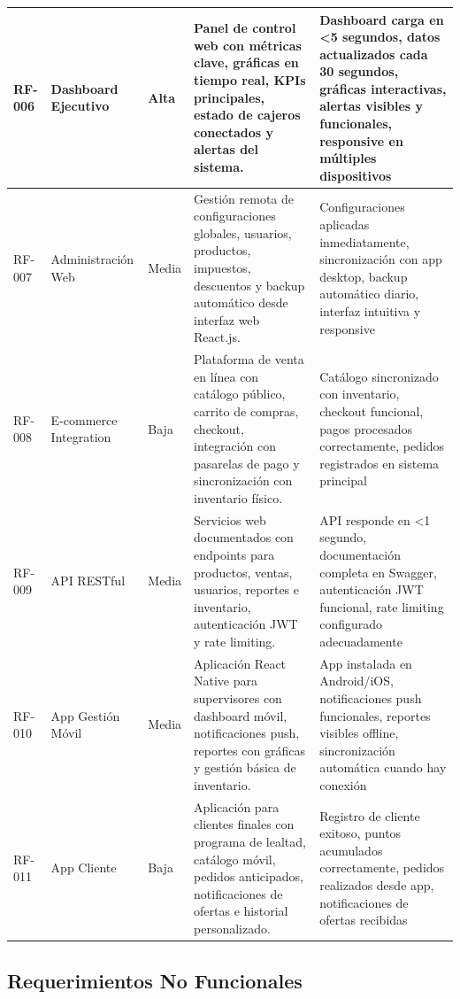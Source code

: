 \documentclass[12pt,letterpaper]{article}
\begin{document}
\begin{longtable}{|>{\centering}p{1.5cm}|p{3.5cm}|>{\centering}p{2cm}|p{6.5cm}|>{\centering\arraybackslash}p{2.5cm}|}
RF-006 & Dashboard Ejecutivo & Alta & Panel de control web con métricas clave, gráficas en tiempo real, KPIs principales, estado de cajeros conectados y alertas del sistema. & Dashboard carga en <5 segundos, datos actualizados cada 30 segundos, gráficas interactivas, alertas visibles y funcionales, responsive en múltiples dispositivos \\
\hline

RF-007 & Administración Web & Media & Gestión remota de configuraciones globales, usuarios, productos, impuestos, descuentos y backup automático desde interfaz web React.js. & Configuraciones aplicadas inmediatamente, sincronización con app desktop, backup automático diario, interfaz intuitiva y responsive \\
\hline

RF-008 & E-commerce Integration & Baja & Plataforma de venta en línea con catálogo público, carrito de compras, checkout, integración con pasarelas de pago y sincronización con inventario físico. & Catálogo sincronizado con inventario, checkout funcional, pagos procesados correctamente, pedidos registrados en sistema principal \\
\hline

RF-009 & API RESTful & Media & Servicios web documentados con endpoints para productos, ventas, usuarios, reportes e inventario, autenticación JWT y rate limiting. & API responde en <1 segundo, documentación completa en Swagger, autenticación JWT funcional, rate limiting configurado adecuadamente \\
\hline

RF-010 & App Gestión Móvil & Media & Aplicación React Native para supervisores con dashboard móvil, notificaciones push, reportes con gráficas y gestión básica de inventario. & App instalada en Android/iOS, notificaciones push funcionales, reportes visibles offline, sincronización automática cuando hay conexión \\
\hline

RF-011 & App Cliente & Baja & Aplicación para clientes finales con programa de lealtad, catálogo móvil, pedidos anticipados, notificaciones de ofertas e historial personalizado. & Registro de cliente exitoso, puntos acumulados correctamente, pedidos realizados desde app, notificaciones de ofertas recibidas \\
\hline
\end{longtable}

\subsection{Requerimientos No Funcionales}
\end{document}
